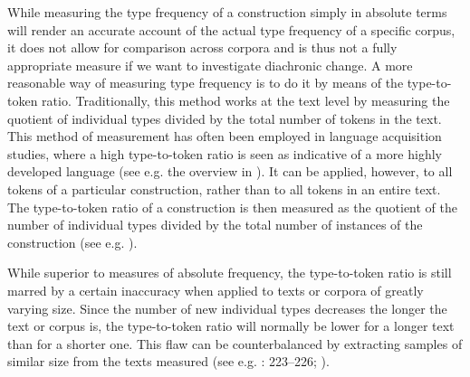 \documentclass[output=paper]{langscibook}
\begin{document}
\begin{sloppypar}
While measuring the type frequency of a construction simply in absolute terms will render an accurate account of the actual type frequency of a specific corpus, it does not allow for comparison across corpora and is thus not a fully appropriate measure if we want to investigate diachronic change. A more reasonable way of measuring type frequency is to do it by means of the type-to-token ratio. Traditionally, this method works at the text level by measuring the quotient of individual types divided by the total number of tokens in the text. This method of measurement has often been employed in language acquisition studies, where a high type-to-token ratio is seen as indicative of a more highly developed language (see e.g. the overview in \citealt{Richards1987}). It can be applied, however, to all tokens of a particular construction, rather than to all tokens in an entire text. The type-to-token ratio of a construction is then measured as the quotient of the number of individual types divided by the total number of instances of the construction (see e.g. \citealt{Olofsson2019}).
\end{sloppypar}



While superior to measures of absolute frequency, the type-to-token ratio is still marred by a certain inaccuracy when applied to texts or corpora of greatly varying size. Since the number of new individual types decreases the longer the text or corpus is, the type-to-token ratio will normally be lower for a longer text than for a shorter one. This flaw can be counterbalanced by extracting samples of similar size from the texts measured (see e.g. \citealt{Baayen2008}: 223–226; \citealt{CovingtonMcFall2010}).
\end{document}
